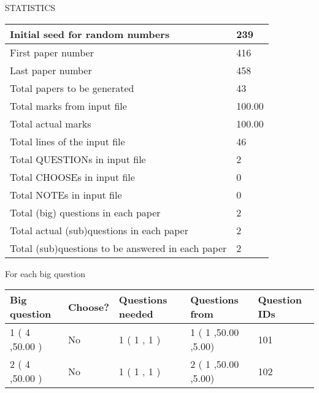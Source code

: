 \documentclass[12pt]{article}
\begin{document}
   
 {\LARGE{STATISTICS}}
   
\vspace{0.2in}
   
 \begin{tabular}{|l|l|}
 \hline
 Initial seed for random numbers & 239  \\
\hline
 First paper number & 416  \\
\hline
 Last  paper number & 458  \\
\hline
 Total papers to be generated & 43  \\
\hline
Total marks from input file & 100.00 \\
\hline
Total actual marks & 100.00 \\
\hline
 Total lines of the input file & 46  \\
 \hline
 Total QUESTIONs in input file & 2  \\
\hline
 Total CHOOSEs in input file & 0  \\
\hline
 Total NOTEs in input file & 0  \\
\hline
 Total (big) questions in each paper & 2  \\
\hline
 Total actual (sub)questions in each paper & 2  \\
\hline
 Total (sub)questions to be answered in each paper & 2  \\
\hline
 \end{tabular}
   
   
 \newpage
   
{\LARGE{For each big question}}
   
   
\vspace{0.2in}
   
   
\noindent\hspace{-0.4in}\begin{tabular}{|l|l|l|l|l|}
\hline
 Big question & Choose? & Questions needed & Questions from & Question IDs \\ 
\hline
 1 ( 4 ,50.00
 ) &  No   & 
 1 ( 1 ,  1 ) &  1 ( 1
,50.00
 ,5.00) &  101  \\
 \hline
 2 ( 4 ,50.00
 ) &  No   & 
 1 ( 1 ,  1 ) &  2 ( 1
,50.00
 ,5.00) &  102  \\
 \hline
 \end{tabular}
 
 
\end{document}

